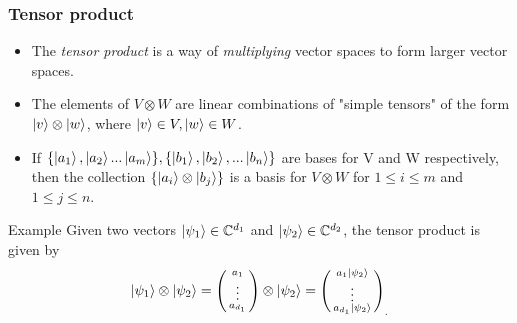 \documentclass[handout, 10 pt]{beamer}
\newcommand{\icol}[1]{%
  \left(\begin{smallmatrix}#1\end{smallmatrix}\right)%
}
\begin{document}
\begin{comment}
Such is the motivation for the "bra-ket" notation, a convention in quantum mechanics.
\end{comment}

\begin{frame}
\frametitle{Tensor product}
\begin{itemize}
    \item The \textit{tensor product} is a way of {\emph{multiplying}} vector spaces to form larger vector spaces. 
    \pause
    \item The elements of $V \otimes W$ are linear combinations of "simple tensors" of the form $\ket{v} \otimes \ket{w}$, where $\ket{v} \in V, \ket{w} \in W$. 
    \pause
    \item If $\{\ket{a_1}, \ket{a_2}...\ket{a_m}\}, \{\ket{b_1},\ket{b_2}, ...\ket{b_n}\}$ are bases for V and W respectively, then the collection $\{\ket{a_i}\otimes\ket{b_j}\}$ is a basis for $V \otimes W$ for $1\leq i \leq m$ and $1 \leq j \leq n$.
\end{itemize}
\pause
\begin{block}{Example}
Given two vectors $\ket{\psi_1}\in\mathbb{C}^{d_1}$ and $\ket{\psi_2}\in\mathbb{C}^{d_2}$, the tensor product is given by
\begin{equation}
\ket{\psi_1} \otimes\ket{\psi_2} = \icol{ a_1\\ \vdots \\ a_{d_1}} \otimes \ket{\psi_2} = {\icol{ a_1\ket{\psi_2}\\ \vdots \\a_{d_1}\ket{\psi_2}}}_.
\end{equation}
\end{block}
\end{frame}
\end{document}
